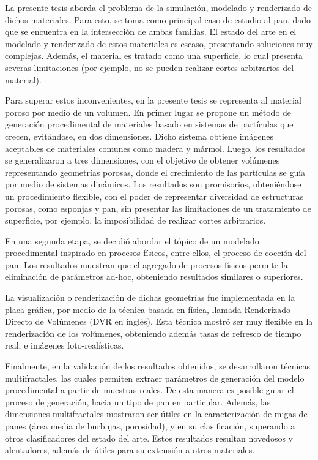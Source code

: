 \documentclass[spanish,a4paper,oneside,10pt,openright]{book}
\begin{document}
La presente tesis aborda el problema de la simulación, modelado y renderizado de dichos materiales.
Para esto, se toma como principal caso de estudio al pan, dado que se encuentra en la intersección de ambas familias.
El estado del arte en el modelado y renderizado de estos materiales es escaso, presentando soluciones muy complejas.
Además, el material es tratado como una superficie, lo cual presenta severas limitaciones (por ejemplo, no se pueden realizar cortes arbitrarios del material).

Para superar estos inconvenientes, en la presente tesis se representa al material poroso por medio de un volumen.
En primer lugar se propone un método de generación procedimental de materiales basado en sistemas de partículas que crecen, evitándose, en dos dimensiones.
Dicho sistema obtiene imágenes aceptables de materiales comunes como madera y mármol.
Luego, los resultados se generalizaron a tres dimensiones, con el objetivo de obtener volúmenes representando geometrías porosas, donde el crecimiento de las partículas se guía por medio de sistemas dinámicos.
Los resultados son promisorios, obteniéndose un procedimiento flexible, con el poder de representar diversidad de estructuras porosas, como esponjas y pan, sin presentar las limitaciones de un tratamiento de superficie, por ejemplo, la imposibilidad de realizar cortes arbitrarios.

En una segunda etapa, se decidió abordar el tópico de un modelado procedimental inspirado en procesos físicos, entre ellos, el proceso de cocción del pan.
Los resultados muestran que el agregado de procesos físicos permite la eliminación de parámetros ad-hoc, obteniendo resultados similares o superiores.

La visualización o renderización de dichas geometrías fue implementada en la placa gráfica, por medio de la técnica basada en física, llamada Renderizado Directo de Volúmenes (DVR en inglés).
Esta técnica mostró ser muy flexible en la renderización de los volúmenes, obteniendo además tasas de refresco de tiempo real, e imágenes foto-realísticas.

Finalmente, en la validación de los resultados obtenidos, se desarrollaron técnicas multifractales, las cuales permiten extraer parámetros de generación del modelo procedimental a partir de muestras reales.
De esta manera es posible guiar el proceso de generación, hacia un tipo de pan en particular.
Además, las dimensiones multifractales mostraron ser útiles en la caracterización de migas de panes (área media de burbujas, porosidad), y en su clasificación, superando a otros clasificadores del estado del arte.
Estos resultados resultan novedosos y alentadores, además de útiles para su extensión a otros materiales.
\end{document}

